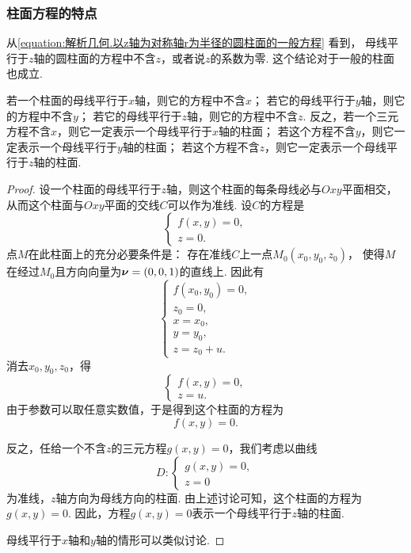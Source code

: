 \subsubsection{柱面方程的特点}
从\cref{equation:解析几何.以z轴为对称轴r为半径的圆柱面的一般方程} 看到，
母线平行于\(z\)轴的圆柱面的方程中不含\(z\)，或者说\(z\)的系数为零.
这个结论对于一般的柱面也成立.
\begin{theorem}
若一个柱面的母线平行于\(x\)轴，则它的方程中不含\(x\)；
若它的母线平行于\(y\)轴，则它的方程中不含\(y\)；
若它的母线平行于\(z\)轴，则它的方程中不含\(z\).
反之，若一个三元方程不含\(x\)，则它一定表示一个母线平行于\(x\)轴的柱面；
若这个方程不含\(y\)，则它一定表示一个母线平行于\(y\)轴的柱面；
若这个方程不含\(z\)，则它一定表示一个母线平行于\(z\)轴的柱面.
\begin{proof}
设一个柱面的母线平行于\(z\)轴，则这个柱面的每条母线必与\(Oxy\)平面相交，
从而这个柱面与\(Oxy\)平面的交线\(C\)可以作为准线.
设\(C\)的方程是\[
	\left\{ \begin{array}{l}
		f(x,y) = 0, \\
		z = 0.
	\end{array} \right.
\]
点\(M\)在此柱面上的充分必要条件是：
存在准线\(C\)上一点\(M_0(x_0,y_0,z_0)\)，
使得\(M\)在经过\(M_0\)且方向向量为\(\boldsymbol{\nu}=(0,0,1)\)的直线上.
因此有\[
	\left\{ \begin{array}{l}
		f(x_0,y_0) = 0, \\
		z_0 = 0, \\
		x = x_0, \\
		y = y_0, \\
		z = z_0 + u.
	\end{array} \right.
\]
消去\(x_0,y_0,z_0\)，得\[
	\left\{ \begin{array}{l}
		f(x,y) = 0, \\
		z = u.
	\end{array} \right.
\]
由于参数可以取任意实数值，于是得到这个柱面的方程为\[
	f(x,y) = 0.
\]

反之，任给一个不含\(z\)的三元方程\(g(x,y)=0\)，我们考虑以曲线\[
	D: \left\{ \begin{array}{l}
		g(x,y) = 0, \\
		z = 0
	\end{array} \right.
\]
为准线，\(z\)轴方向为母线方向的柱面.
由上述讨论可知，这个柱面的方程为\(g(x,y)=0\).
因此，方程\(g(x,y)=0\)表示一个母线平行于\(z\)轴的柱面.

母线平行于\(x\)轴和\(y\)轴的情形可以类似讨论.
\end{proof}
\end{theorem}

